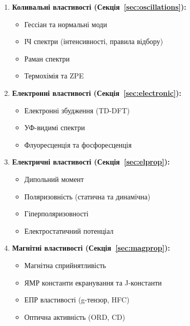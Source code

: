 \begin{enumerate}
    \item \textbf{Коливальні властивості (Секція~\ref{sec:oscillations}):}
    \begin{itemize}
        \item Гессіан та нормальні моди
        \item ІЧ спектри (інтенсивності, правила відбору)
        \item Раман спектри
        \item Термохімія та ZPE
    \end{itemize}

    \item \textbf{Електронні властивості (Секція~\ref{sec:electronic}):}
    \begin{itemize}
        \item Електронні збудження (TD-DFT)
        \item УФ-видимі спектри
        \item Флуоресценція та фосфоресценція
    \end{itemize}

    \item \textbf{Електричні властивості (Секція~\ref{sec:elprop}):}
    \begin{itemize}
        \item Дипольний момент
        \item Поляризовність (статична та динамічна)
        \item Гіперполяризовності
        \item Електростатичний потенціал
    \end{itemize}

    \item \textbf{Магнітні властивості (Секція~\ref{sec:magprop}):}
    \begin{itemize}
        \item Магнітна сприйнятливість
        \item ЯМР константи екранування та J-константи
        \item ЕПР властивості (g-тензор, HFC)
        \item Оптична активність (ORD, CD)
    \end{itemize}
\end{enumerate}

